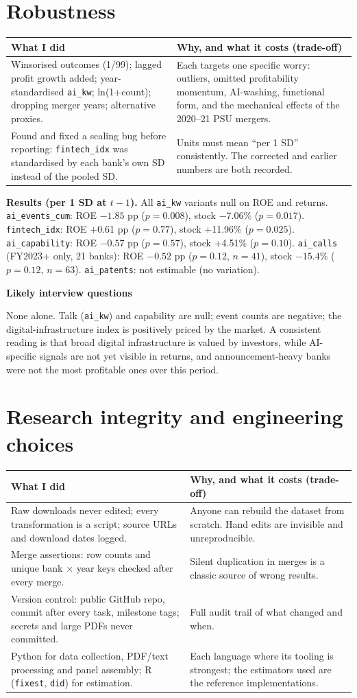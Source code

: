 \documentclass[10.5pt,a4paper]{article}
\newcommand{\var}[1]{\texttt{#1}}
\newenvironment{decisions}{%
  \begin{longtable}{L{0.36\textwidth} L{0.58\textwidth}}
  \toprule
  \textcolor{head}{\textbf{What I did}} & \textcolor{head}{\textbf{Why, and what it costs (trade-off)}}\\
  \midrule\endhead}{%
  \end{longtable}}
\newcommand{\row}[2]{#1 & #2\\ \midrule}
\newenvironment{qa}{\par\noindent\textcolor{qcol}{\textbf{Likely interview questions}}\begin{description}[font=\normalfont\itshape,leftmargin=0pt,style=nextline]}{\end{description}}
\newcommand{\q}[2]{\item[``#1'']#2}
\begin{document}
\section{Robustness}
\begin{decisions}
\row{Winsorised outcomes (1/99); lagged profit growth added; year-standardised \var{ai\_kw}; ln(1+count); dropping
merger years; alternative proxies.}
{Each targets one specific worry: outliers, omitted profitability momentum, AI-washing, functional form, and the
mechanical effects of the 2020--21 PSU mergers.}
\row{Found and fixed a scaling bug before reporting: \var{fintech\_idx} was standardised by each bank's own SD instead
of the pooled SD.}
{Units must mean ``per 1 SD'' consistently. The corrected and earlier numbers are both recorded.}
\end{decisions}
\textbf{Results (per 1 SD at $t-1$).} All \var{ai\_kw} variants null on ROE and returns. \var{ai\_events\_cum}: ROE
$-1.85$ pp ($p=0.008$), stock $-7.06\%$ ($p=0.017$). \var{fintech\_idx}: ROE +0.61 pp ($p=0.77$), stock +11.96\%
($p=0.025$). \var{ai\_capability}: ROE $-0.57$ pp ($p=0.57$), stock +4.51\% ($p=0.10$). \var{ai\_calls}
(FY2023+ only, 21 banks): ROE $-0.52$ pp ($p=0.12$, $n=41$), stock $-15.4\%$ ($p=0.12$, $n=63$). \var{ai\_patents}: not
estimable (no variation).
\begin{qa}
\q{Your proxies disagree in sign. Which one do you trust?}{None alone. Talk (\var{ai\_kw}) and capability are null;
event counts are negative; the digital-infrastructure index is positively priced by the market. A consistent reading is
that broad digital infrastructure is valued by investors, while AI-specific signals are not yet visible in returns, and
announcement-heavy banks were not the most profitable ones over this period.}
\end{qa}

\section{Research integrity and engineering choices}
\begin{decisions}
\row{Raw downloads never edited; every transformation is a script; source URLs and download dates logged.}
{Anyone can rebuild the dataset from scratch. Hand edits are invisible and unreproducible.}
\row{Merge assertions: row counts and unique bank $\times$ year keys checked after every merge.}
{Silent duplication in merges is a classic source of wrong results.}
\row{Version control: public GitHub repo, commit after every task, milestone tags; secrets and large PDFs never
committed.}
{Full audit trail of what changed and when.}
\row{Python for data collection, PDF/text processing and panel assembly; R (\var{fixest}, \var{did}) for estimation.}
{Each language where its tooling is strongest; the estimators used are the reference implementations.}
\end{decisions}
\end{document}

